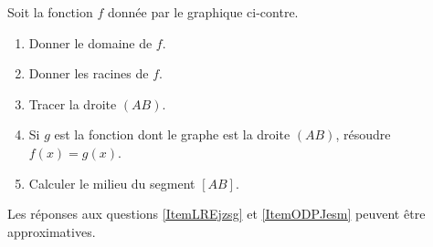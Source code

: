 
\begin{exercice}\label{exosmath-0006}

    \begin{multicols}{2}
    Soit la fonction \( f\) donnée par le graphique ci-contre.
        \begin{enumerate}
            \item
                Donner le domaine de \( f\).
            \item
                Donner les racines de \( f\).
            \item \label{ItemLREjzsg}
                Tracer la droite \( (AB)\).
            \item\label{ItemODPJesm}
                Si \( g\) est la fonction dont le graphe est la droite \( (AB)\), résoudre \( f(x)=g(x)\).
            \item
                Calculer le milieu du segment \( [AB]\).
        \end{enumerate}


        \columnbreak


    \end{multicols}
    Les réponses aux questions \ref{ItemLREjzsg} et \ref{ItemODPJesm} peuvent être approximatives.
        

\end{exercice}

